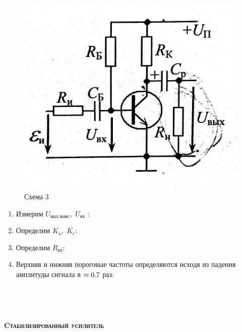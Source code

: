 \documentclass[a4paper]{article}
\begin{document}
\begin{enumerate}
    \begin{figure}[H]
        \begin{center}
            \includegraphics[scale = 0.15]{3_1.jpg}
            \caption{Схема 3}
            \label{sch3}
        \end{center}
    \end{figure}

        \begin{enumerate}
            \item Измерим $U_{вых. макс}, \; U_{вх}$ :

            \item Определим $K_u, \; K_e$:

            \item Определим $R_{вх}$:

            \item Верхняя и нижняя пороговые частоты определяются исходя из падения амплитуды сигнала в $\approx 0.7$ раз:
        \end{enumerate}

\

\

\begin{center}
    \scshape\large\textbf{Cтабилизированный усилитель}
\end{center}


\end{enumerate}
\end{document}
